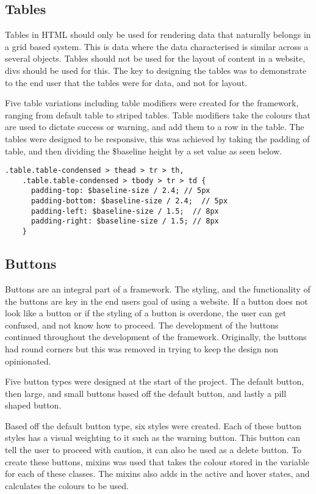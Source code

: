 \subsection*{Tables}
Tables in \gls{HTML} should only be used for rendering data that naturally belongs in a grid based system. This is data where the data characterised is similar across a several objects. Tables should not be used for the layout of content in a website, divs should be used for this. The key to designing the tables was to demonstrate to the end user that the tables were for data, and not for layout.

Five table variations including table modifiers were created for the framework, ranging from default table to striped tables. Table modifiers take the colours that are used to dictate success or warning, and add them to a row in the table. The tables were designed to be responsive, this was achieved by taking the padding of table, and then dividing the \$baseline height by a set value as seen below. 

\begin{lstlisting}[language=CSS3]
    .table.table-condensed > thead > tr > th,
    .table.table-condensed > tbody > tr > td {
      padding-top: $baseline-size / 2.4; // 5px
      padding-bottom: $baseline-size / 2.4;  // 5px
      padding-left: $baseline-size / 1.5;  // 8px
      padding-right: $baseline-size / 1.5; // 8px
    }
\end{lstlisting}


\subsection*{Buttons}
Buttons are an integral part of a framework. The styling, and the functionality of the buttons are key in the end users goal of using a website. If a button does not look like a button or if the styling of a button is overdone, the user can get confused, and not know how to proceed. The development of the buttons continued throughout the development of the framework. Originally, the buttons had round corners but this was removed in trying to keep the design non opinionated. 

Five button types were designed at the start of the project. The default button, then large, and small buttons based off the default button, and lastly a pill shaped button. 

Based off the default button type, six styles were created. Each of these button styles has a visual weighting to it such as the warning button. This button can tell the user to proceed with caution, it can also be used as a delete button. To create these buttons, \gls{mixins} was used that takes the colour stored in the variable for each of these classes. The \gls{mixins} also adds in the active and hover states, and calculates the colours to be used. 

